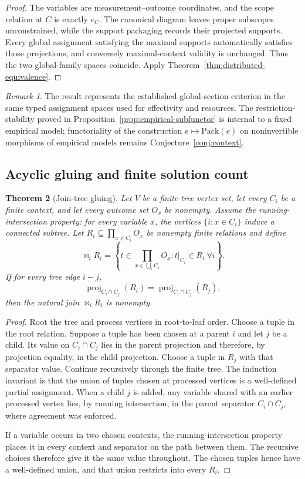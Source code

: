 \documentclass[11pt]{article}
\theoremstyle{plain}
\newtheorem{theorem}{Theorem}[section]
\theoremstyle{definition}
\theoremstyle{remark}
\newtheorem{remark}[theorem]{Remark}
\begin{document}
\begin{proof}
The variables are measurement--outcome coordinates, and the scope relation at
$C$ is exactly $e_C$. The canonical diagram leaves proper subscopes
unconstrained, while the support packaging records their projected supports.
Every global assignment satisfying the maximal supports automatically satisfies
those projections, and conversely maximal-context validity is unchanged. Thus
the two global-family spaces coincide. Apply
Theorem~\ref{thm:distributed-equivalence}.
\end{proof}

\begin{remark}
The result represents the established global-section criterion in the same typed
assignment spaces used for effectivity and resources. The restriction-stability
proved in Proposition~\ref{prop:empirical-subfunctor} is internal to a fixed empirical model; functoriality of the
construction $e\mapsto\mathrm{Pack}(e)$ on noninvertible morphisms of empirical
models remains Conjecture~\ref{conj:context}.
\end{remark}

\subsection{Acyclic gluing and finite solution count}

\begin{theorem}[Join-tree gluing]\label{thm:jointree}
Let $V$ be a finite tree vertex set, let every $C_i$ be a finite context, and
let every outcome set $O_x$ be nonempty. Assume the running-intersection
property: for every variable $x$, the vertices $\{i:x\in C_i\}$ induce a
connected subtree. Let $R_i\subseteq\prod_{x\in C_i}O_x$ be nonempty finite
relations and define
\[
\Join_iR_i=
\left\{t\in\prod_{x\in\bigcup_iC_i}O_x:
 t|_{C_i}\in R_i\ \forall i\right\}.
\]
If for every tree edge $i{-}j$,
\[
\operatorname{proj}_{C_i\cap C_j}(R_i)
=
\operatorname{proj}_{C_i\cap C_j}(R_j),
\]
then the natural join $\Join_iR_i$ is nonempty.
\end{theorem}

\begin{proof}
Root the tree and process vertices in root-to-leaf order. Choose a tuple in the
root relation. Suppose a tuple has been chosen at a parent $i$ and let $j$ be a
child. Its value on
$C_i\cap C_j$ lies in the parent projection and therefore, by projection
equality, in the child projection. Choose a tuple in $R_j$ with that separator
value. Continue recursively through the finite tree. The induction invariant is that
the union of tuples chosen at processed vertices is a well-defined partial
assignment. When a child $j$ is added, any variable shared with an earlier
processed vertex lies, by running intersection, in the parent separator
$C_i\cap C_j$, where agreement was enforced.

If a variable occurs in two chosen contexts, the running-intersection property
places it in every context and separator on the path between them. The recursive
choices therefore give it the same value throughout. The chosen tuples hence
have a well-defined union, and that union restricts into every $R_i$.
\end{proof}
\end{document}
